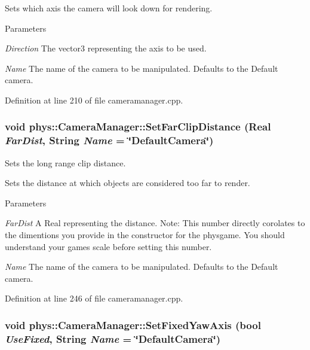 Sets which axis the camera will look down for rendering. 
\begin{DoxyParams}{Parameters}
\item[{\em Direction}]The vector3 representing the axis to be used. \item[{\em Name}]The name of the camera to be manipulated. Defaults to the Default camera. \end{DoxyParams}


Definition at line 210 of file cameramanager.cpp.

\hypertarget{classphys_1_1CameraManager_a809e4e31a9ad42afd620e95508ad78d7}{
\subsubsection[{SetFarClipDistance}]{\setlength{\rightskip}{0pt plus 5cm}void phys::CameraManager::SetFarClipDistance ({\bf Real} {\em FarDist}, \/  {\bf String} {\em Name} = {\ttfamily \char`\"{}DefaultCamera\char`\"{}})}}
\label{d9/d91/classphys_1_1CameraManager_a809e4e31a9ad42afd620e95508ad78d7}


Sets the long range clip distance. 

Sets the distance at which objects are considered too far to render. 
\begin{DoxyParams}{Parameters}
\item[{\em FarDist}]A Real representing the distance. Note: This number directly corolates to the dimentions you provide in the constructor for the physgame. You should understand your games scale before setting this number. \item[{\em Name}]The name of the camera to be manipulated. Defaults to the Default camera. \end{DoxyParams}


Definition at line 246 of file cameramanager.cpp.

\hypertarget{classphys_1_1CameraManager_aa7370f2239e88ab151b72c4171afea07}{
\subsubsection[{SetFixedYawAxis}]{\setlength{\rightskip}{0pt plus 5cm}void phys::CameraManager::SetFixedYawAxis (bool {\em UseFixed}, \/  {\bf String} {\em Name} = {\ttfamily \char`\"{}DefaultCamera\char`\"{}})}}
\label{d9/d91/classphys_1_1CameraManager_aa7370f2239e88ab151b72c4171afea07}



